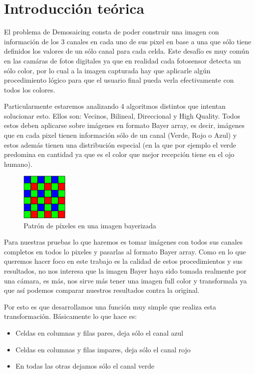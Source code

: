 \section{Introducci\'on te\'orica}

El problema de Demosaicing consta de poder construir una imagen con información de los 3 canales en cada uno de sus pixel en base a una que sólo tiene definidos los valores de un sólo canal para cada celda. Este desafío es muy común en las camáras de fotos digitales ya que en realidad cada fotosensor detecta un sólo color, por lo cual a la imagen capturada hay que aplicarle algún procedimiento lógico para que el usuario final pueda verla efectivamente con todos los colores.

Particularmente estaremos analizando 4 algoritmos distintos que intentan solucionar esto. Ellos son: Vecinos, Bilineal, Direccional y High Quality. Todos estos deben aplicarse sobre imágenes en formato Bayer array, es decir, imágenes que en cada pixel tienen información sólo de un canal (Verde, Rojo o Azul) y estos además tienen una distribución especial (en la que por ejemplo el verde predomina en cantidad ya que es el color que mejor recepción tiene en el ojo humano).

\begin{figure}[htb]
\begin{center}
       \includegraphics[width=0.2\textwidth]{imagenes/bayer.jpg}
       \caption{Patrón de píxeles en una imagen bayerizada}
       \end{center}

\end{figure}


Para nuestras pruebas lo que haremos es tomar imágenes con todos sus canales completos en todos lo pixeles y pasarlas al formato Bayer array. Como en lo que queremos hacer foco en este trabajo es la calidad de estos procedimientos y sus resultados, no nos interesa que la imagen Bayer haya sido tomada realmente por una cámara, es más, nos sirve más tener una imagen full color y transformala ya que así podemos comparar nuestros resultados contra la original.

Por esto es que desarrollamos una función muy simple que realiza esta transformación. Básicamente lo que hace es: 
\begin{itemize}
\item Celdas en columnas y filas pares, deja sólo el canal azul
\item Celdas en columnas y filas impares, deja sólo el canal rojo
\item En todas las otras dejamos sólo el canal verde
\end{itemize}   


